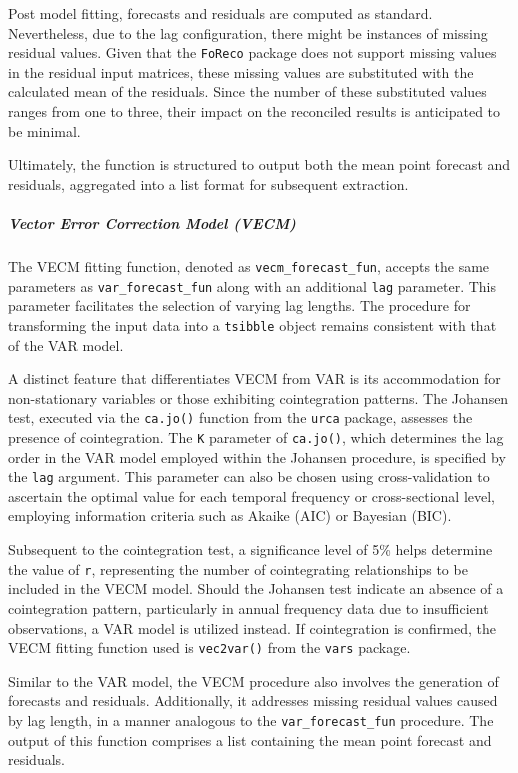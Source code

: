 \documentclass[11pt,a4paper,]{article}
\begin{document}
Post model fitting, forecasts and residuals are computed as standard. Nevertheless, due to the lag configuration, there might be instances of missing residual values. Given that the \texttt{FoReco} package does not support missing values in the residual input matrices, these missing values are substituted with the calculated mean of the residuals. Since the number of these substituted values ranges from one to three, their impact on the reconciled results is anticipated to be minimal.

Ultimately, the function is structured to output both the mean point forecast and residuals, aggregated into a list format for subsequent extraction.

\subparagraph{Vector Error Correction Model (VECM)}\label{vector-error-correction-model-vecm}

The VECM fitting function, denoted as \texttt{vecm\_forecast\_fun}, accepts the same parameters as \texttt{var\_forecast\_fun} along with an additional \texttt{lag} parameter. This parameter facilitates the selection of varying lag lengths. The procedure for transforming the input data into a \texttt{tsibble} object remains consistent with that of the VAR model.

A distinct feature that differentiates VECM from VAR is its accommodation for non-stationary variables or those exhibiting cointegration patterns. The Johansen test, executed via the \texttt{ca.jo()} function from the \texttt{urca} package, assesses the presence of cointegration. The \texttt{K} parameter of \texttt{ca.jo()}, which determines the lag order in the VAR model employed within the Johansen procedure, is specified by the \texttt{lag} argument. This parameter can also be chosen using cross-validation to ascertain the optimal value for each temporal frequency or cross-sectional level, employing information criteria such as Akaike (AIC) or Bayesian (BIC).

Subsequent to the cointegration test, a significance level of 5\% helps determine the value of \texttt{r}, representing the number of cointegrating relationships to be included in the VECM model. Should the Johansen test indicate an absence of a cointegration pattern, particularly in annual frequency data due to insufficient observations, a VAR model is utilized instead. If cointegration is confirmed, the VECM fitting function used is \texttt{vec2var()} from the \texttt{vars} package.

Similar to the VAR model, the VECM procedure also involves the generation of forecasts and residuals. Additionally, it addresses missing residual values caused by lag length, in a manner analogous to the \texttt{var\_forecast\_fun} procedure. The output of this function comprises a list containing the mean point forecast and residuals.
\end{document}
